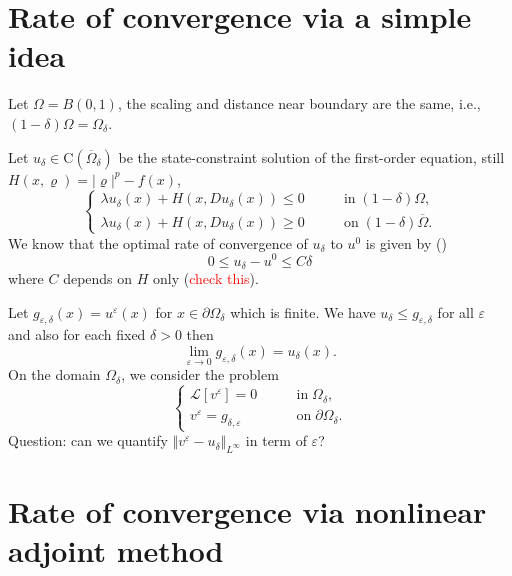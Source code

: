 \documentclass[11pt,reqno]{amsart}
\numberwithin{figure}{section}
\theoremstyle{plain}
\theoremstyle{remark}
\numberwithin{equation}{section}
\newcommand{\rmC}{\mathrm{C}}
\begin{document}
\newpage
\section{Rate of convergence via a simple idea}
\noindent Let $\Omega = B(0,1)$, the scaling and distance near boundary are the same, i.e., $(1-\delta)\Omega = \Omega_\delta$.

\noindent Let $u_\delta\in \rmC(\overline{\Omega}_\delta)$ be the state-constraint solution of the first-order equation, still $H(x,\varrho) = |\varrho|^p - f(x)$,
\begin{equation*}
    \begin{cases}
    \lambda u_\delta(x) + H(x,Du_\delta(x)) \leq 0 &\qquad\text{in}\;(1-\delta)\Omega,\\
    \lambda u_\delta(x) + H(x,Du_\delta(x)) \geq 0 &\qquad\text{on}\;(1-\delta)\overline{\Omega}.
    \end{cases}
\end{equation*}
We know that the optimal rate of convergence of $u_\delta$ to $u^0$ is given by (\cite{kim_state-constraint_2020})
\begin{equation*}
    0\leq u_\delta - u^0 \leq C\delta
\end{equation*}
where $C$ depends on $H$ only (\textcolor{red}{check this}). 

\noindent Let $g_{\varepsilon,\delta}(x) = u^\varepsilon(x)$ for $x\in \partial\Omega_\delta$ which is finite. We have $u_\delta\leq g_{\varepsilon,\delta}$ for all $\varepsilon$ and also for each fixed $\delta>0$ then
\begin{equation*}
    \lim_{\varepsilon\to 0} g_{\varepsilon,\delta}(x) = u_\delta(x).
\end{equation*}
On the domain $\Omega_\delta$, we consider the problem
\begin{equation*}
    \begin{cases}
    \mathcal{L}[v^\varepsilon] = 0 &\qquad\text{in}\;\Omega_\delta,\\
    v^\varepsilon = g_{\delta,\varepsilon} &\qquad\text{on}\;\partial\Omega_\delta.
    \end{cases}
\end{equation*}
Question: can we quantify $\Vert v^\varepsilon - u_\delta\Vert_{L^\infty}$ in term of $\varepsilon$?

\section{Rate of convergence via nonlinear adjoint method}
\end{document}
